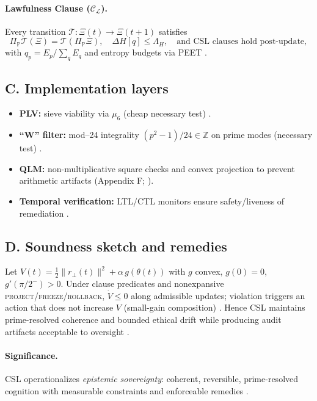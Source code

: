 \documentclass[12pt]{amsart}
\theoremstyle{plain}
\begin{document}
\paragraph{Lawfulness Clause ($\mathcal{C}_{\mathcal{L}}$).}
Every transition $\mathcal{T}:\Xi(t)\!\to\!\Xi(t+1)$ satisfies
\[
\Pi_{\mathbb{P}}\mathcal{T}(\Xi)=\mathcal{T}(\Pi_{\mathbb{P}}\Xi),\quad
\Delta H[q]\le \Lambda_H,\quad \text{and CSL clauses hold post-update},
\]
with $q_p=E_p/\sum_q E_q$ and entropy budgets via PEET \cite{cover2006elements}.

\subsection*{C. Implementation layers}
\begin{itemize}
  \item \textbf{PLV:} sieve viability via $\mu_6$ (cheap necessary test) \cite{hardy2008introduction}.
  \item \textbf{“W” filter:} mod–24 integrality $(p^2-1)/24\in\mathbb{Z}$ on prime modes (necessary test) \cite{hardy2008introduction}.
  \item \textbf{QLM:} non-multiplicative square checks and convex projection to prevent arithmetic artifacts (Appendix F; \cite{boyd2004convex}).
  \item \textbf{Temporal verification:} LTL/CTL monitors ensure safety/liveness of remediation \cite{clarke1999model,baier2008model}.
\end{itemize}

\subsection*{D. Soundness sketch and remedies}
Let $V(t)=\tfrac12\|r_\perp(t)\|^2+\alpha\,g(\theta(t))$ with $g$ convex, $g(0)=0$, $g'(\pi/2^-)>0$. Under clause predicates and nonexpansive \textsc{project}/\textsc{freeze}/\textsc{rollback}, $\dot V\le 0$ along admissible updates; violation triggers an action that does not increase $V$ (small-gain composition) \cite{khalil2002nonlinear}. Hence CSL maintains prime-resolved coherence and bounded ethical drift while producing audit artifacts acceptable to oversight \cite{schneider2000enforceable}.

\paragraph{Significance.}
CSL operationalizes \emph{epistemic sovereignty}: coherent, reversible, prime-resolved cognition with measurable constraints and enforceable remedies \cite{amodei2016concrete,gabriel2020artificial}.
\end{document}
